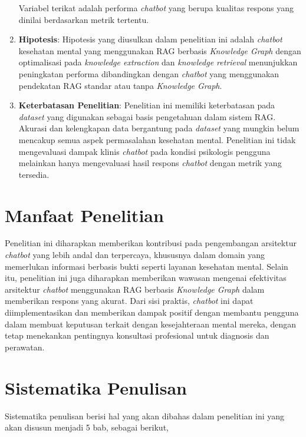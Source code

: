 \begin{enumerate}
	      Variabel terikat adalah performa \textit{chatbot} yang berupa kualitas respons yang dinilai berdasarkan metrik tertentu.
	\item	\textbf{Hipotesis}: Hipotesis yang diusulkan dalam penelitian ini adalah \textit{chatbot} kesehatan mental yang menggunakan RAG berbasis \textit{Knowledge Graph} dengan optimalisasi pada \textit{knowledge extraction} dan \textit{knowledge retrieval} menunjukkan peningkatan performa dibandingkan dengan \textit{chatbot} yang menggunakan pendekatan RAG standar atau tanpa \textit{Knowledge Graph}.
	\item	\textbf{Keterbatasan Penelitian}: Penelitian ini memiliki keterbatasan pada \textit{dataset} yang digunakan sebagai basis pengetahuan dalam sistem RAG.
	      Akurasi dan kelengkapan data bergantung pada \textit{dataset} yang mungkin belum mencakup semua aspek permasalahan kesehatan mental.
	      Penelitian ini tidak mengevaluasi dampak klinis \textit{chatbot} pada kondisi psikologis pengguna melainkan hanya mengevaluasi hasil respons \textit{chatbot} dengan metrik yang tersedia.
\end{enumerate}

\section{Manfaat Penelitian}
Penelitian ini diharapkan memberikan kontribusi pada pengembangan arsitektur \textit{chatbot} yang lebih andal dan terpercaya, khususnya dalam domain yang memerlukan informasi berbasis bukti seperti layanan kesehatan mental.
Selain itu, penelitian ini juga diharapkan memberikan wawasan mengenai efektivitas arsitektur \textit{chatbot} menggunakan RAG berbasis \textit{Knowledge Graph} dalam memberikan respons yang akurat.
Dari sisi praktis, \textit{chatbot} ini dapat diimplementasikan dan memberikan dampak positif dengan membantu pengguna dalam membuat keputusan terkait dengan kesejahteraan mental mereka, dengan tetap menekankan pentingnya konsultasi profesional untuk diagnosis dan perawatan.
\section{Sistematika Penulisan}
Sistematika penulisan berisi hal yang akan dibahas dalam penelitian ini yang akan disusun menjadi 5 bab, sebagai berikut,

